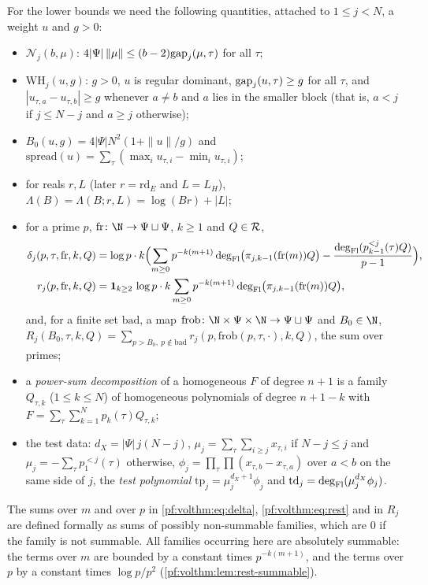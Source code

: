 For the lower bounds we need the following quantities, attached to $1\le j<N$, a weight $u$ and $g>0$:
\begin{itemize}
\item $\mathcal N_j(b,\mu)$: $4|\Psi|\,\|\mu\|\le(b-2)\mathrm{gap}_j(\mu,\tau)$ for all $\tau$;
\item $\mathrm{WH}_j(u,g)$: $g>0$, $u$ is regular dominant, $\mathrm{gap}_j(u,\tau)\ge g$ for all $\tau$, and
  $|u_{\tau,a}-u_{\tau,b}|\ge g$ whenever $a\ne b$ and $a$ lies in the smaller block (that is, $a<j$ if
  $j\le N-j$ and $a\ge j$ otherwise);
\item $B_0(u,g)=4|\Psi|N^2(1+\|u\|/g)$ and $\mathrm{spread}(u)=\sum_\tau(\max_iu_{\tau,i}-\min_iu_{\tau,i})$;
\item for reals $r,L$ (later $r=\mathrm{rd}_E$ and $L=L_H$), $\Lambda(B)=\Lambda(B;r,L)=\log(Br)+|L|$;
\item for a prime $p$, $\mathrm{fr}\colon\N\to\Psi\sqcup\Psi$, $k\ge1$ and $Q\in\mathcal{R}$,
  \begin{align}
  \delta_j(p,\tau,\mathrm{fr},k,Q)&=\log p\cdot k\Bigl(\sum_{m\ge0}p^{-k(m+1)}
    \deg_{\mathrm{Fl}}\bigl(\pi_{j,k-1}(\mathrm{fr}(m))Q\bigr)-\frac{\deg_{\mathrm{Fl}}(p^{<j}_{k-1}(\tau)Q)}{p-1}\Bigr),
    \label{pf:volthm:eq:delta}\\
  r_j(p,\mathrm{fr},k,Q)&=\mathbf 1_{k\ge2}\,\log p\cdot k\sum_{m\ge0}p^{-k(m+1)}
    \deg_{\mathrm{Fl}}\bigl(\pi_{j,k-1}(\mathrm{fr}(m))Q\bigr),\label{pf:volthm:eq:rest}
  \end{align}
  and, for a finite set $\mathrm{bad}$, a map $\mathrm{frob}\colon\N\times\Psi\times\N\to\Psi\sqcup\Psi$ and
  $B_0\in\N$, $R_j(B_0,\tau,k,Q)=\sum_{p>B_0,\ p\notin\mathrm{bad}}r_j(p,\mathrm{frob}(p,\tau,\cdot),k,Q)$,
  the sum over primes;
\item a \emph{power-sum decomposition} of a homogeneous $F$ of degree $n+1$ is a family $Q_{\tau,k}$
  ($1\le k\le N$) of homogeneous polynomials of degree $n+1-k$ with
  $F=\sum_\tau\sum_{k=1}^Np_k(\tau)Q_{\tau,k}$;
\item the test data: $d_X=|\Psi|\,j(N-j)$,
  $\mu_j=\sum_\tau\sum_{i\ge j}x_{\tau,i}$ if $N-j\le j$ and $\mu_j=-\sum_\tau p_1^{<j}(\tau)$ otherwise, $\phi_j=\prod_\tau\prod(x_{\tau,b}-x_{\tau,a})$ over $a<b$ on the same side of $j$, the \emph{test polynomial} $\mathrm{tp}_j=\mu_j^{d_X+1}\phi_j$ and
  $\mathrm{td}_j=\deg_{\mathrm{Fl}}(\mu_j^{d_X}\phi_j)$.
\end{itemize}

\begin{remark}\label{pf:volthm:rem:sums}
The sums over $m$ and over $p$ in \eqref{pf:volthm:eq:delta}, \eqref{pf:volthm:eq:rest} and in $R_j$ are
defined formally as sums of possibly non-summable families, which are $0$ if the family is not summable. All
families occurring here are absolutely summable: the terms over $m$ are bounded by a constant times
$p^{-k(m+1)}$, and the terms over $p$ by a constant times $\log p/p^2$ (\cref{pf:volthm:lem:rest-summable}).
\end{remark}

